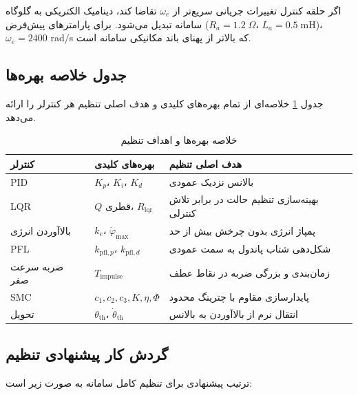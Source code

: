اگر حلقه کنترل تغییرات جریانی سریع‌تر از $\omega_e$ تقاضا کند، دینامیک الکتریکی به گلوگاه سامانه تبدیل می‌شود. برای پارامترهای پیش‌فرض ($R_a = 1.2\;\Omega$، $L_a = 0.5\;\text{mH}$)، $\omega_e = 2400$ rad/s که بالاتر از پهنای باند مکانیکی سامانه است.


\subsection{جدول خلاصه بهره‌ها}

جدول \ref{tab:gains-summary} خلاصه‌ای از تمام بهره‌های کلیدی و هدف اصلی تنظیم هر کنترلر را ارائه می‌دهد.

\begin{table}[H]
\centering
\caption{خلاصه بهره‌ها و اهداف تنظیم}
\label{tab:gains-summary}
\begin{tabular}{@{}lll@{}}
\toprule
کنترلر & بهره‌های کلیدی & هدف اصلی تنظیم \\
\midrule
PID & $K_p$، $K_i$، $K_d$ & بالانس نزدیک عمودی \\
LQR & $Q$ قطری، $R_{\text{lqr}}$ & بهینه‌سازی تنظیم حالت در برابر تلاش کنترلی \\
بالاآوردن انرژی & $k_e$، $\dot\varphi_{\max}$ & پمپاژ انرژی بدون چرخش بیش از حد \\
PFL & $k_{\text{pfl},p}$، $k_{\text{pfl},d}$ & شکل‌دهی شتاب پاندول به سمت عمودی \\
ضربه سرعت صفر & $T_{\text{impulse}}$ & زمان‌بندی و بزرگی ضربه در نقاط عطف \\
SMC & $c_1,c_2,c_3,K,\eta,\Phi$ & پایدارسازی مقاوم با چترینگ محدود \\
تحویل & $\theta_{\text{th}}$، $\dot\theta_{\text{th}}$ & انتقال نرم از بالاآوردن به بالانس \\
\bottomrule
\end{tabular}
\end{table}


\subsection{گردش کار پیشنهادی تنظیم}

ترتیب پیشنهادی برای تنظیم کامل سامانه به صورت زیر است:

